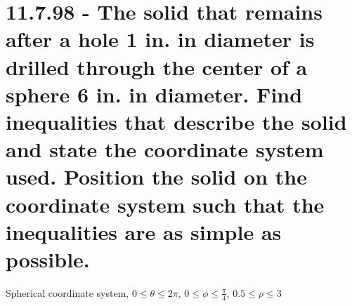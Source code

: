\documentclass{article}
\begin{document}
\section{11.7.98 - The solid that remains after a hole 1 in. in diameter is drilled through the center of a sphere 6 in. in diameter.  Find inequalities that describe the solid and state the coordinate system used.  Position the solid on the coordinate system such that the inequalities are as simple as possible.}

\par\noindent\Large Spherical coordinate system, $0 \leq \theta \leq 2\pi$, $0 \leq \phi \leq \frac{\pi}{4}$, $0.5 \leq \rho \leq 3$
\end{document}
